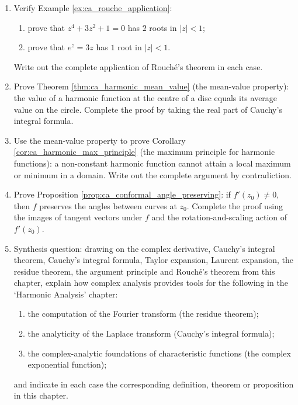 \begin{enumerate}[leftmargin=3em, label=\textbf{Exercise \arabic*}]
    \item Verify Example \ref{ex:ca_rouche_application}:
    \begin{enumerate}[label=(\roman*)]
        \item prove that $z^4+3z^2+1=0$ has $2$ roots in $|z|<1$;
        \item prove that $e^z=3z$ has $1$ root in $|z|<1$.
    \end{enumerate}
    Write out the complete application of Rouché's theorem in each case.

    \item Prove Theorem \ref{thm:ca_harmonic_mean_value} (the mean-value property):
    the value of a harmonic function at the centre of a disc equals its average value on the circle.
    Complete the proof by taking the real part of Cauchy's integral formula.

    \item Use the mean-value property to prove Corollary \ref{cor:ca_harmonic_max_principle}
    (the maximum principle for harmonic functions):
    a non-constant harmonic function cannot attain a local maximum or minimum in a domain.
    Write out the complete argument by contradiction.

    \item Prove Proposition \ref{prop:ca_conformal_angle_preserving}:
    if $f'(z_0)\neq 0$, then $f$ preserves the angles between curves at $z_0$.
    Complete the proof using the images of tangent vectors under $f$ and the rotation-and-scaling action of $f'(z_0)$.

    \item Synthesis question: drawing on the complex derivative, Cauchy's integral theorem,
    Cauchy's integral formula, Taylor expansion, Laurent expansion, the residue theorem,
    the argument principle and Rouché's theorem from this chapter,
    explain how complex analysis provides tools for the following in the `Harmonic Analysis' chapter:
    \begin{enumerate}[label=(\roman*)]
        \item the computation of the Fourier transform (the residue theorem);
        \item the analyticity of the Laplace transform (Cauchy's integral formula);
        \item the complex-analytic foundations of characteristic functions (the complex exponential function);
    \end{enumerate}
    and indicate in each case the corresponding definition, theorem or proposition in this chapter.

\end{enumerate}

